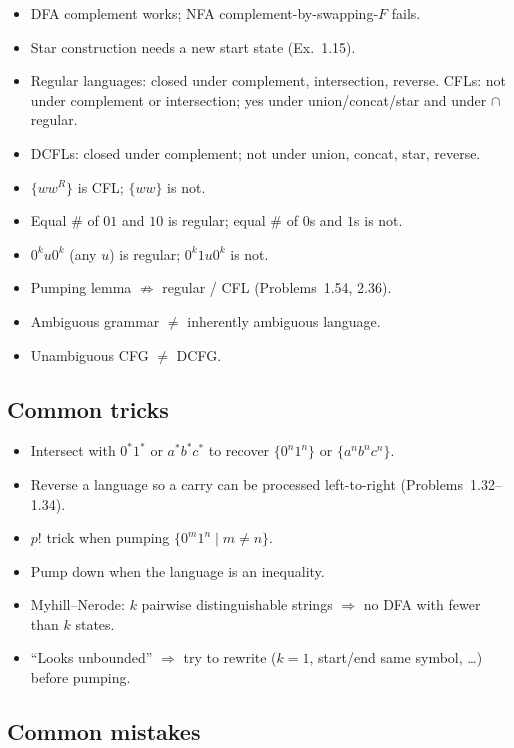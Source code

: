 \documentclass[11pt,a4paper]{article}
\begin{document}
\begin{itemize}[leftmargin=1.2em]
  \item DFA complement works; NFA complement-by-swapping-$F$
        fails.
  \item Star construction needs a new start state (Ex.~1.15).
  \item Regular languages: closed under complement, intersection,
        reverse. CFLs: not under complement or intersection;
        yes under union/concat/star and under $\cap$ regular.
  \item DCFLs: closed under complement; not under union, concat,
        star, reverse.
  \item $\{ww^R\}$ is CFL; $\{ww\}$ is not.
  \item Equal $\#$ of $01$ and $10$ is regular; equal $\#$ of
        $0$s and $1$s is not.
  \item $0^ku0^k$ (any $u$) is regular; $0^k1u0^k$ is not.
  \item Pumping lemma $\not\Rightarrow$ regular / CFL
        (Problems~1.54, 2.36).
  \item Ambiguous grammar $\neq$ inherently ambiguous language.
  \item Unambiguous CFG $\neq$ DCFG.
\end{itemize}

\subsection{Common tricks}

\begin{itemize}[leftmargin=1.2em]
  \item Intersect with $0^*1^*$ or $a^*b^*c^*$ to recover
        $\{0^n1^n\}$ or $\{a^nb^nc^n\}$.
  \item Reverse a language so a carry can be processed
        left-to-right (Problems~1.32--1.34).
  \item $p!$ trick when pumping $\{0^m1^n\mid m\neq n\}$.
  \item Pump down when the language is an inequality.
  \item Myhill--Nerode: $k$ pairwise distinguishable strings
        $\Rightarrow$ no DFA with fewer than $k$ states.
  \item ``Looks unbounded'' $\Rightarrow$ try to rewrite
        ($k=1$, start/end same symbol, \ldots) before pumping.
\end{itemize}

\subsection{Common mistakes}
\end{document}
